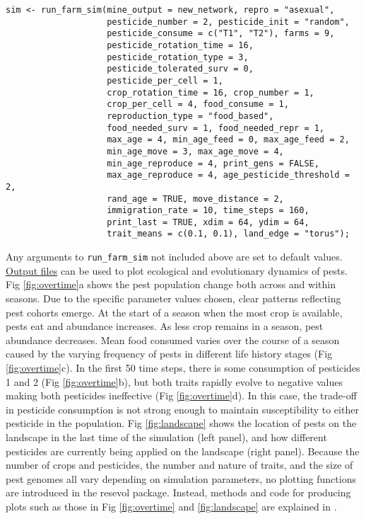\documentclass[10pt,letterpaper]{article}
\begin{document}
\begin{verbatim}
sim <- run_farm_sim(mine_output = new_network, repro = "asexual", 
                    pesticide_number = 2, pesticide_init = "random", 
                    pesticide_consume = c("T1", "T2"), farms = 9,
                    pesticide_rotation_time = 16, 
                    pesticide_rotation_type = 3,
                    pesticide_tolerated_surv = 0, 
                    pesticide_per_cell = 1,
                    crop_rotation_time = 16, crop_number = 1, 
                    crop_per_cell = 4, food_consume = 1, 
                    reproduction_type = "food_based", 
                    food_needed_surv = 1, food_needed_repr = 1, 
                    max_age = 4, min_age_feed = 0, max_age_feed = 2, 
                    min_age_move = 3, max_age_move = 4, 
                    min_age_reproduce = 4, print_gens = FALSE,
                    max_age_reproduce = 4, age_pesticide_threshold = 2, 
                    rand_age = TRUE, move_distance = 2, 
                    immigration_rate = 10, time_steps = 160, 
                    print_last = TRUE, xdim = 64, ydim = 64,
                    trait_means = c(0.1, 0.1), land_edge = "torus");
\end{verbatim}


Any arguments to \texttt{run\_farm\_sim} not included above are set to default values.
\protect\hyperlink{output}{Output files} can be used to plot ecological and evolutionary dynamics of pests.
Fig \ref{fig:overtime}a shows the pest population change both across and within seasons.
Due to the specific parameter values chosen, clear patterns reflecting pest cohorts emerge.
At the start of a season when the most crop is available, pests eat and abundance increases.
As less crop remains in a season, pest abundance decreases.
Mean food consumed varies over the course of a season caused by the varying frequency of pests in different life history stages (Fig \ref{fig:overtime}c).
In the first 50 time steps, there is some consumption of pesticides 1 and 2 (Fig \ref{fig:overtime}b), but both traits rapidly evolve to negative values making both pesticides ineffective (Fig \ref{fig:overtime}d).
In this case, the trade-off in pesticide consumption is not strong enough to maintain susceptibility to either pesticide in the population.
Fig \ref{fig:landscape} shows the location of pests on the landscape in the last time of the simulation (left panel), and how different pesticides are currently being applied on the landscape (right panel).
Because the number of crops and pesticides, the number and nature of traits, and the size of pest genomes all vary depending on simulation parameters, no plotting functions are introduced in the resevol package.
Instead, methods and code for producing plots such as those in Fig \ref{fig:overtime} and \ref{fig:landscape} are explained in .
\end{document}
